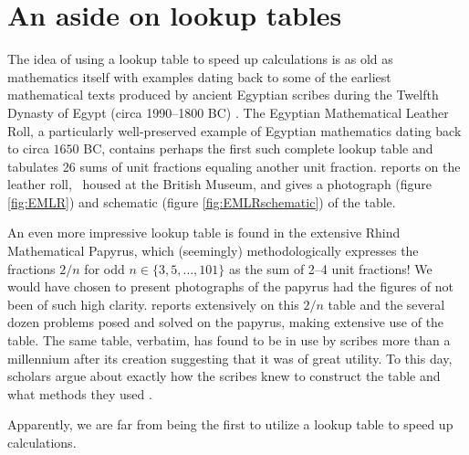 \section{An aside on lookup tables}
The idea of using a lookup table to speed up calculations is as old as mathematics itself with examples dating back to some of the earliest mathematical texts produced by ancient Egyptian scribes during the Twelfth Dynasty of Egypt (circa 1990--1800 BC) \citep[p. 1, footnote 4]{Neugebauer45}. The Egyptian Mathematical Leather Roll, a particularly well-preserved example of Egyptian mathematics dating back to circa $1650$ BC, contains perhaps the first such complete lookup table and tabulates 26 sums of unit fractions equaling another unit fraction. \citet{Glanville27} reports on the leather roll,\footnotemark~ housed at the British Museum, and gives a photograph (figure \ref{fig:EMLR}) and schematic (figure \ref{fig:EMLRschematic}) of the table.


An even more impressive lookup table is found in the extensive Rhind Mathematical Papyrus, which (seemingly) methodologically expresses the fractions $2/n$ for odd $n \in \lbrace 3, 5, \dots, 101 \rbrace$ as the sum of 2--4 unit fractions! We would have chosen to present photographs of the papyrus had the figures of \citep{Glanville27} not been of such high clarity. \citet{Gillings82} reports extensively on this $2/n$ table and the several dozen problems posed and solved on the papyrus, making extensive use of the table. The same table, verbatim, has found to be in use by scribes more than a millennium after its creation suggesting that it was of great utility. To this day, scholars argue about exactly how the scribes knew to construct the table and what methods they used \citep{Gillings74, Abdulaziz08}.

Apparently, we are far from being the first to utilize a lookup table to speed up calculations.\footnotemark


